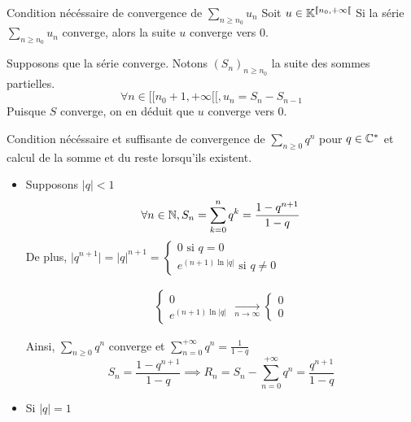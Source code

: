 \documentclass{article}
\date{22 juin 2024}
\begin{document}
\maketitle

\begin{question_kholle}{Condition nécéssaire de convergence de $\sum_{n \geqslant n_0} u_n$}
    Soit $u \in \mathbb K^{[ \! [ n_{0}, + \infty [ \![}$
    Si la série $\sum_{n\geqslant n_{0}}u_{n}$ converge, alors la suite $u$ converge vers $0$.
    
    Supposons que la série converge. Notons $(S_{n})_{n\geqslant n_{0}}$ la suite des sommes partielles.
$$\forall n \in [ \! [ n_{0}+1, +\infty [ \![, u_{n} = S_{n} - S_{n-1}$$
    Puisque $S$ converge, on en déduit que $u$ converge vers $0$.
\end{question_kholle}
\begin{question_kholle}{Condition nécéssaire et suffisante de convergence de $\sum_{n\geqslant 0}q^{n}$ pour $q \in \mathbb C^{*}$ et calcul de la somme et du reste lorsqu'ils existent.}
    \begin{itemize}[label=$\star$]
        \item Supposons $\lvert q \rvert<1$
        $$\forall n \in \mathbb N, S_{n} = \sum_{k=0}^{n}q^{k} = \frac{1-q^{n+1}}{1-q}$$
        De plus, $\lvert q^{n+1} \rvert=\lvert q \rvert^{n+1}= \left\{ \begin{array}{ll}0 \text{ si }q=0\\ e^{(n+1)\ln \lvert q \rvert} \text{ si }q\neq 0\end{array}\right.$
        
        \begin{align*}
            \left\{ \begin{array}{ll}
                0 \\
                e^{(n+1)\ln \lvert q \rvert } 
            \end{array}\right. \xrightarrow[n\to \infty]{} \left\{ \begin{array}{ll}
                0 \\
                0 
            \end{array}\right.
        \end{align*}
        
        Ainsi, $\sum_{n\geqslant 0}q^{n}$ converge et $\sum_{n=0}^{+\infty}q^{n}=\frac{1}{1-q}$
        $$S_{n} = \frac{1-q^{n+1}}{1-q} \implies R_{n} = S_{n} - \sum_{n=0}^{+\infty}q^{n}= \frac{q^{n+1}}{1-q}$$
        
        \item Si $\lvert q \rvert=1$
        

\end{itemize}
\end{question_kholle}
\end{document}

